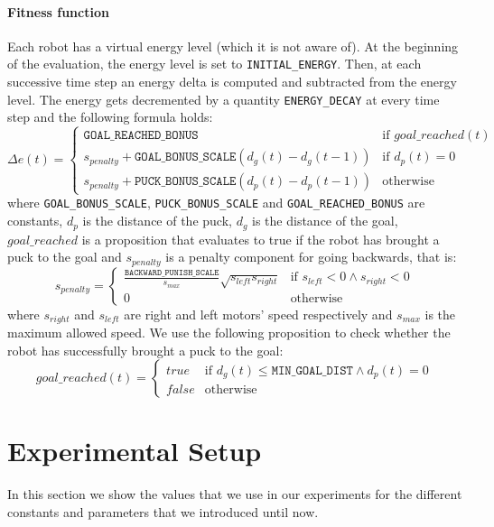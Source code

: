 \documentclass{article}
\begin{document}
	\paragraph{Fitness function} %
	\label{par:foraging_fitness}
	Each robot has a virtual energy level (which it is not aware of). At the
	beginning of the evaluation, the energy level is set to \texttt{INITIAL\_ENERGY}.
	Then, at each successive time step an energy delta is computed and
	subtracted from the energy level. The energy gets decremented by a quantity
	\texttt{ENERGY\_DECAY} at every time step and the following formula holds:
	$$
	\Delta e(t)=
	\begin{cases}
		\mathtt{GOAL\_REACHED\_BONUS} & \textrm{if } goal\_reached(t) \\
		s_{penalty} + \mathtt{GOAL\_BONUS\_SCALE} (d_g(t) - d_g(t-1)) &
		\textrm{if } d_p(t) = 0 \\
		s_{penalty} + \mathtt{PUCK\_BONUS\_SCALE} (d_p(t) - d_p(t-1)) &
		\textrm{otherwise}
	\end{cases}
	$$
	where \texttt{GOAL\_BONUS\_SCALE}, \texttt{PUCK\_BONUS\_SCALE} and
	\texttt{GOAL\_REACHED\_BONUS} are constants, $d_p$ is the distance of the
	puck, $d_g$ is the distance of the goal, $goal\_reached$ is a proposition
	that evaluates to true if the robot has brought a puck to the goal and
	$s_{penalty}$ is a penalty component for going backwards, that is:
	$$
	s_{penalty}=
	\begin{cases}
		\frac{\mathtt{BACKWARD\_PUNISH\_SCALE}}{s_{max}} \sqrt{s_{left} s_{right}}
		  & \textrm{if } s_{left} < 0 \wedge s_{right} < 0 \\
		0 & \textrm{otherwise}
	\end{cases}
	$$
	where $s_{right}$ and $s_{left}$ are right and left motors' speed
	respectively and $s_{max}$ is the maximum allowed speed. We use the
	following proposition to check whether the robot has successfully brought a puck
	to the goal:
	$$
	goal\_reached(t)=
	\begin{cases}
		true & \textrm{if } d_g(t) \le \mathtt{MIN\_GOAL\_DIST} \wedge d_p(t) =	0 \\
		false & \textrm{otherwise}
	\end{cases}
	$$



	\section{Experimental Setup} %
	\label{sec:setup}
	In this section we show the values that we use in our experiments for the
	different constants and parameters that we introduced until now.
\end{document}
